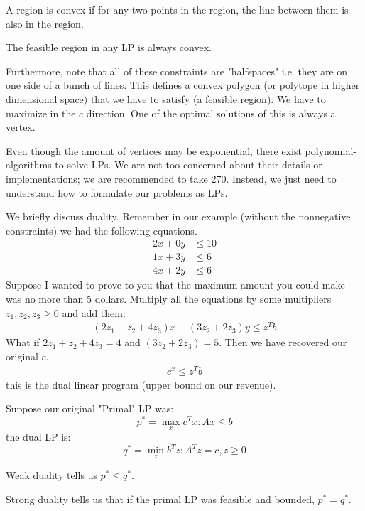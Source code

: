 \begin{definition}[Convexity]
    A region is convex if for any two points in the region, the line between them is also in the region.
\end{definition}

\begin{theorem}
    The feasible region in any LP is always convex.
\end{theorem}

Furthermore, note that all of these constraints are "halfspaces" i.e. they are on one side of a bunch of lines. This defines
a convex polygon (or polytope in higher dimensional space) that we have to satisfy (a feasible region). We have to maximize in the $c$ direction. One
of the optimal solutions of this is always a vertex.

Even though the amount of vertices may be exponential, there exist polynomial-algorithms to solve LPs. We are not too
concerned about their details or implementations; we are recommended to take 270. Instead, we just need to understand how to formulate
our problems as LPs.

We briefly discuss duality. Remember in our example (without the nonnegative constraints) we had the following equations.
\begin{align*}
    2x + 0y &\leq 10 \\
    1x + 3y &\leq 6 \\ 
    4x + 2y &\leq 6
\end{align*}
Suppose I wanted to prove to you
that the maximum amount you could make was no more than 5 dollars. Multiply all the equations by some multipliers $z_1, z_2, z_3 \geq 0$ and add them:
\begin{align*}
    (2z_1 + z_2 + 4z_3)x + (3z_2 + 2z_3)y \leq z^T b
\end{align*}
What if $2z_1 + z_2 + 4z_3 = 4$ and $(3z_2 + 2z_3) = 5$. Then we have recovered our original $c$.
\begin{align*}
    c^x \leq z^T b
\end{align*}
this is the dual linear program (upper bound on our revenue).

\begin{definition} [Duality]
    Suppose our original "Primal" LP was:
    \[ p^* = \max_{x} c^T x : Ax \leq b \]
    the dual LP is:
    \[ q^* = \min_{z} b^T z : A^Tz = c, z \geq 0 \]
\end{definition}

\begin{theorem}
    Weak duality tells us $p^* \leq q^*$.

    Strong duality tells us that if the primal LP was feasible and bounded,
    $p^* = q^*$.
\end{theorem}